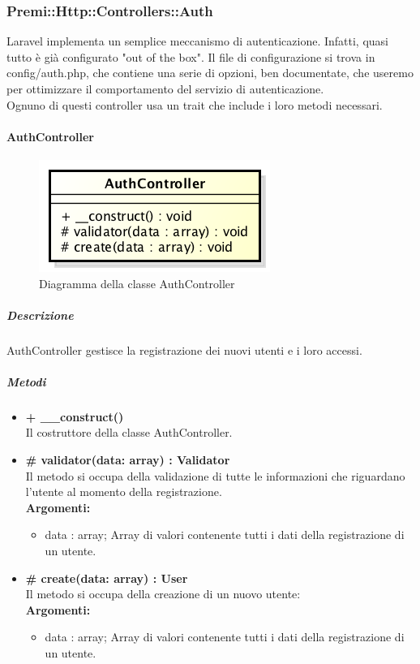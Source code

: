 \newpage
\subsubsection{Premi::Http::Controllers::Auth}
Laravel implementa un semplice meccanismo di autenticazione. Infatti, quasi tutto è già configurato "out of the box". Il file di configurazione si trova in config/auth.php, che contiene una serie di opzioni, ben documentate, che useremo per ottimizzare il comportamento del servizio di autenticazione.\\
Ognuno di questi controller usa un trait che include i loro metodi necessari.
	\paragraph{AuthController}
	\begin{figure}[h]
\centering
\includegraphics[width=0.5\linewidth]{img/back_end_http_controllers_authController}
\caption[Diagramma della classe AuthController]{Diagramma della classe AuthController}
\label{fig:back_end_http_controllers_authController}
\end{figure}
		\subparagraph{Descrizione}
			AuthController gestisce la registrazione dei nuovi utenti e i loro accessi.
		\subparagraph{Metodi}
			\begin{itemize}
				\item \textbf{+ \_\_construct()}\\
				Il costruttore della classe AuthController.
				\item \textbf{\# validator(data: array) : Validator}\\
				Il metodo si occupa della validazione di tutte le informazioni che riguardano l'utente al momento della registrazione.\\
					\textbf{Argomenti:}
						\begin{itemize}
							\item data : array;
							Array di valori contenente tutti i dati della registrazione di un utente. 
						\end{itemize}
				\item \textbf{\# create(data: array) : User}\\
				Il metodo si occupa della creazione di un nuovo utente:\\
					\textbf{Argomenti:}
						\begin{itemize}
							\item data : array;
							Array di valori contenente tutti i dati della registrazione di un utente.
						\end{itemize}
			\end{itemize}
			
